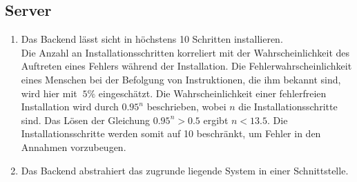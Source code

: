 \subsection*{Server}

\begin{samepage}
    \begin{enumerate}[label=\textbf{/NFP\arabic*0/}, align=left, start=3]
        \item Das \Gls{Backend} lässt sicht in höchstens 10 Schritten installieren. \\
              Die Anzahl an Installationsschritten korreliert mit der Wahrscheinlichkeit des Auftreten eines Fehlers während der Installation.
              Die Fehlerwahrscheinlichkeit eines Menschen bei der Befolgung von Instruktionen, die ihm bekannt sind, wird hier mit $~5\%$ eingeschätzt.
              Die Wahrscheinlichkeit einer fehlerfreien Installation wird durch $0.95^n$ beschrieben, wobei $n$ die Installationsschritte sind.
              Das Lösen der Gleichung $0.95^n > 0.5$ ergibt $n < 13.5$. Die Installationsschritte werden somit auf 10 beschränkt, um Fehler in den Annahmen vorzubeugen.
        \item Das \Gls{Backend} abstrahiert das zugrunde liegende \Gls{System} in einer \Gls{Schnittstelle}.
    \end{enumerate}
\end{samepage}
